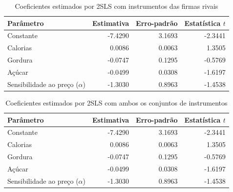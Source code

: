 
\begingroup
\begin{table}[H]
\centering
\caption{Coeficientes estimados por 2SLS com instrumentos das firmas rivais}
\label{tab:coef-2sls-firmas-rivais}
\small
\begin{tabular}{lrrr}
\toprule
Parâmetro & Estimativa & Erro-padrão & Estatística $t$ \\
\midrule
Constante & -7.4290 & 3.1693 & -2.3441 \\
Calorias & 0.0086 & 0.0063 & 1.3505 \\
Gordura & -0.0747 & 0.1295 & -0.5769 \\
Açúcar & -0.0499 & 0.0308 & -1.6197 \\
Sensibilidade ao preço ($\alpha$) & -1.3030 & 0.8963 & -1.4538 \\
\bottomrule
\end{tabular}
\end{table}
\endgroup


\begingroup
\begin{table}[H]
\centering
\caption{Coeficientes estimados por 2SLS com ambos os conjuntos de instrumentos}
\label{tab:coef-2sls-ambos-instrumentos}
\small
\begin{tabular}{lrrr}
\toprule
Parâmetro & Estimativa & Erro-padrão & Estatística $t$ \\
\midrule
Constante & -7.4290 & 3.1693 & -2.3441 \\
Calorias & 0.0086 & 0.0063 & 1.3505 \\
Gordura & -0.0747 & 0.1295 & -0.5769 \\
Açúcar & -0.0499 & 0.0308 & -1.6197 \\
Sensibilidade ao preço ($\alpha$) & -1.3030 & 0.8963 & -1.4538 \\
\bottomrule
\end{tabular}
\end{table}
\endgroup


